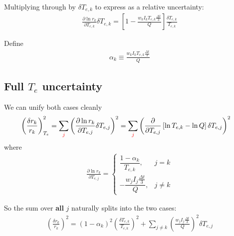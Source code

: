 \documentclass[11pt,twoside]{article}
\begin{document}
Multiplying through by $\delta T_{e,k}$ to express as a relative uncertainty:
\begin{align}
\frac{\partial \ln r_k}{\partial T_{e,k}} \delta T_{e,k} = \left[ 1 - \frac{w_k I_k T_{e,k} \frac{\Delta t}{3}}{Q}\right]\frac{\delta T_{e,k}}{T_{e,k}}
\end{align}

Define
\begin{align}
\boxed{
\alpha_k \equiv \frac{w_k I_k T_{e,k} \frac{\Delta t}{3}}{Q} \label{eq:alpha_k}
}
\end{align}

\subsection{Full $T_e$ uncertainty}
We can unify both cases cleanly
\begin{align}
\left(\frac{\delta r_k}{r_k}\right)_{T_e}^2 &= \sum_{\color{red}{j}}\left( \frac{\partial \ln r_k}{\partial T_{e,j}} \delta T_{e,j}\right)^2
=
\sum_{\color{red}{j}}\left( \frac{\partial }{\partial T_{e,j}} \left[ \ln T_{e,k} - \ln Q \right]\delta T_{e,j}\right)^2 
\end{align}
where
\begin{align}
\frac{\partial \ln r_k}{\partial T_{e,j}} =
\begin{cases}
\dfrac{1-\alpha_k}{T_{e,k}}, & j=k\\[1em]
-\dfrac{w_j I_j \frac{\Delta t}{3}}{Q}, & j\neq k
\end{cases}
\end{align}

So the sum over \textbf{all} $j$ naturally splits into the two cases:
\begin{align}
\boxed{
\left(\frac{\delta r_k}{r_k}\right)^2 = (1 - \alpha_k)^2\left(\frac{\delta T_{e,k}}{T_{e,k}}\right)^2 + \sum_{j\neq k}\left(\frac{w_jI_j\frac{\Delta t}{3}}{Q}\right)^2  \delta T_{e,j}
}
\end{align}
\end{document}
